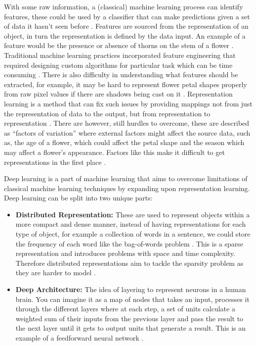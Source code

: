 \documentclass[12pt,a4paper]{report}
\begin{document}
\par

With some raw information, a (classical) machine learning process can identify features, these could be used by a 
classifier that can make predictions given a set of data it hasn't seen before \citep{lecun2015deep}. Features are 
sourced from the representation of an object, in turn the representation is defined by the 
data input. An example of a feature would be the presence or absence of thorns on the stem of a flower 
\citep[p. 22]{goodfellow2016deep}. Traditional machine learning practices incorporated 
feature engineering that required designing custom algorithms for particular task which can be time consuming 
\citep{liu2020representation}. There is also difficulty in understanding what features should be extracted, 
for example, it may be hard to represent flower petal shapes properly from raw pixel values if there are shadows being 
cast on it \citep[p. 23]{goodfellow2016deep}. Representation learning is a method that 
can fix such issues by providing mappings not from just the representation of data to the output, but from 
representation to representation \citep[p. 24]{goodfellow2016deep}. There are however, 
still hurdles to overcome, these are described as “factors of variation” where external factors might affect the source 
data, such as, the age of a flower, which could affect the petal shape and the season which may affect a flower's 
appearance. Factors like this make it difficult to get representations in the first place 
\citep[p. 24]{goodfellow2016deep}.

\par

Deep learning is a part of machine learning that aims to overcome limitations of classical machine learning techniques 
by expanding upon representation learning. Deep learning can be split into two unique parts:

\begin{itemize}
    \item \textbf{Distributed Representation:} These are used to represent objects within a more compact and dense manner, 
instead of having representations for each type of object, for example a collection of words in a sentence, we could 
store the frequency of each word like the bag-of-words problem \citep{liu2020representation}. This is a sparse
representation and introduces problems with space and time complexity. Therefore distributed representations aim to 
tackle the sparsity problem as they are harder to model \citep{Brownlee2017}.
    \item \textbf{Deep Architecture:} The idea of layering to represent neurons in a human brain. You can imagine it as a map of 
nodes that takes an input, processes it through the different layers where at each step, a set of units calculate a 
weighted sum of their inputs from the previous layer and pass the result to the next layer until it gets to output units
that generate a result. This is an example of a feedforward neural network \citep{lecun2015deep}.
\end{itemize}
\end{document}
